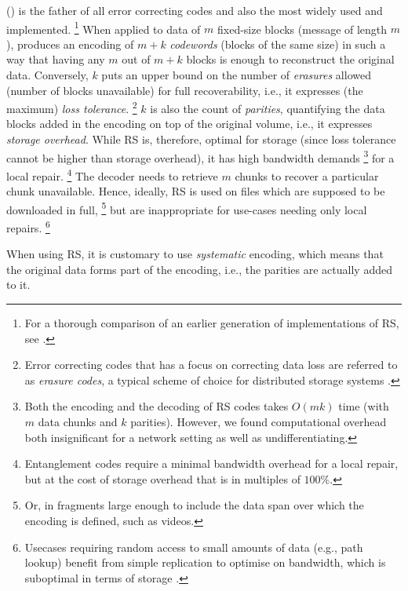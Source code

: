  () \cite{lubyetal1995CRS,plank2006optimizing,li2013erasure} 
is the father of all  error correcting codes and also the most widely used and implemented.%
%
\footnote{%
For a thorough comparison of an earlier generation of implementations of RS, see \cite{plank2009performance}.}
% 
When applied to data of $m$ fixed-size blocks (message of length $m$), produces an encoding of $m+k$ \emph{codewords} (blocks of the same size) 
in such a way that having any $m$ out of $m+k$ blocks is enough to reconstruct the original data. Conversely, $k$ puts an upper bound on the number of \emph{erasures} allowed (number of blocks unavailable) for full recoverability, i.e., it expresses (the maximum) \emph{loss tolerance}.%
%
\footnote{Error correcting codes that has a focus on correcting data loss are referred to as \emph{erasure codes}, a typical scheme of choice for distributed storage systems \cite{balaji2018erasure}.}
%
$k$ is also the count of \emph{parities}, quantifying the data blocks added in the encoding on top of the original volume, i.e., it expresses \emph{storage overhead}. While RS is, therefore, optimal for storage (since loss tolerance cannot be higher than storage overhead), 
it has high bandwidth demands%
%
\footnote{Both the encoding and the decoding of RS codes takes $O(mk)$ time (with $m$ data chunks and $k$ parities). However, we found computational overhead both insignificant for a network setting as well as undifferentiating.}
%
for a local repair.%
%
\footnote{Entanglement codes \cite{estrada2018alpha, estrada2019building} require a minimal bandwidth overhead for a local repair, but at the cost of storage overhead that is in multiples of $100\%$.}
%
The decoder needs to retrieve $m$ chunks to recover a particular chunk unavailable. 
Hence, ideally, RS is used on files which are supposed to be downloaded in full,%
%
\footnote{Or, in  fragments large enough  to include the data span over which the encoding is defined, such as videos.}%
%
but are inappropriate for use-cases needing only local repairs.%
%
\footnote{Usecases requiring random access to small amounts of data (e.g., path lookup) benefit from simple replication to optimise on bandwidth, which is suboptimal in terms of storage \cite{weatherspoon2002erasure}.}

When using RS, it is customary to use \emph{systematic} encoding, which means that the original data forms part of the encoding, i.e., the parities are actually added to it.%
%
%
% 
%


